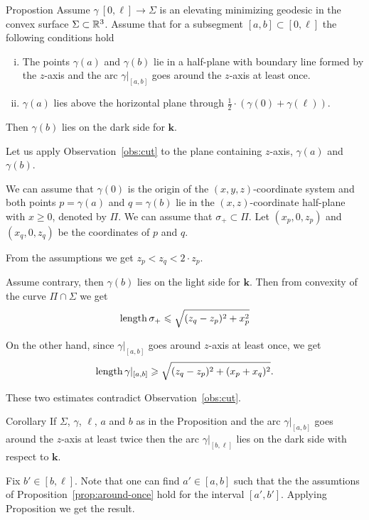 \documentclass[a4paper,10pt]{amsart}
\begin{document}
\begin{thm}{Propostion}\label{prop:around-once}
Assume $\gamma\:[0,\ell]\to \Sigma$ is an elevating minimizing geodesic in the convex surface $\Sigma\subset \mathbb{R}^3$.
Assume that for a subsegment $[a,b]\subset [0,\ell]$ the following conditions hold
\begin{enumerate}[(i)]
\item The points $\gamma(a)$ and $\gamma(b)$ lie in a half-plane with boundary line formed by the $z$-axis
and  the arc $\gamma|_{[a,b]}$ goes around the $z$-axis at least once.
\item $\gamma(a)$ lies above the horizontal plane through $\tfrac12\cdot(\gamma(0)+\gamma(\ell))$.
\end{enumerate}
Then  $\gamma(b)$ lies on the dark side for $\bm{k}$.
\end{thm}

Let us apply Observation~\ref{obs:cut} to the plane containing $z$-axis, $\gamma(a)$ and $\gamma(b)$.


We can assume that $\gamma(0)$ is the origin of the $(x,y,z)$-coordinate system
and both points $p=\gamma(a)$ and $q=\gamma(b)$ lie in the $(x,z)$-coordinate half-plane with $x\ge 0$, denoted by $\Pi$.
We can assume that $\sigma_+\subset \Pi$.
Let $(x_p,0,z_p)$ and $(x_q,0,z_q)$ be the coordinates of $p$ and $q$.

From the assumptions we get $z_p<z_q<2\cdot z_p$.

Assume contrary,
then $\gamma(b)$ lies on the light side for $\bm{k}$.
Then from convexity of the curve $\Pi\cap \Sigma$
we get 
\[\mathop{\rm length}\nolimits\sigma_+\leqslant \sqrt{(z_q-z_p)^2+x_p^2}\]

On the other hand, since $\gamma|_{[a,b]}$ goes around $z$-axis at least once,
we get 
\[\mathop{\rm length}\nolimits\gamma|_{[a,b]}\geqslant \sqrt{(z_q-z_p)^2+(x_p+x_q)^2}.\]

These two estimates contradict Observation~\ref{obs:cut}.
\qeds

\begin{thm}{Corollary}\label{cor:around-twice}
If $\Sigma$, $\gamma$, $\ell$, $a$ and $b$ as in the Proposition and the arc $\gamma|_{[a,b]}$ goes around the $z$-axis at least twice
then the arc $\gamma|_{[b,\ell]}$ lies on the dark side with respect to $\bm{k}$.
\end{thm}

Fix $b'\in [b,\ell]$.
Note that one can find $a'\in [a,b]$ such that the the assumtions of Proposition~\ref{prop:around-once} hold for the interval $[a',b']$. Applying Proposition we get the result.\qeds 
\end{document}
